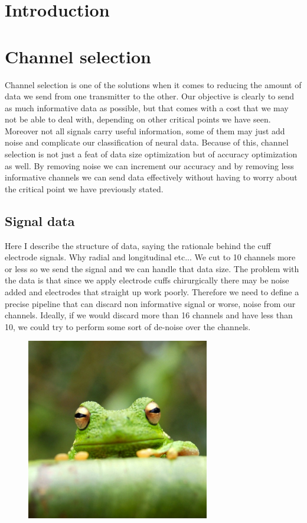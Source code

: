 \documentclass{Configuration_Files/PoliMi3i_thesis}
\begin{document}
\section{Introduction}

\section{Channel selection}

Channel selection is one of the  solutions when it comes to reducing the amount of data we send from one transmitter to the other.
Our objective is clearly to send as much informative data as possible, but that comes with a cost that we may not be able to deal with, depending on other critical points we have seen.
Moreover not all signals carry useful information, some of them may just add noise and complicate our classification of neural data.
Because of this, channel selection is not just a feat of data size optimization but of accuracy optimization as well.
By removing noise we can increment our accuracy and by removing less informative channels we can send data effectively without having to worry about the critical point we have previously stated.
\cite{abdullahEEGChannelSelection2022}


\subsection{Signal data}

Here I describe the structure of data, saying the rationale behind the cuff electrode signals.
Why radial and longitudinal etc...
We cut to 10 channels more or less so we send the signal and we can handle that data size.
The problem with the data is that since we apply electrode cuffs chirurgically there may be noise added and electrodes that straight up work poorly.
Therefore we need to define a precise pipeline that can discard non informative signal or worse, noise from our channels.
Ideally, if we would discard more than 16 channels and have less than 10, we could try to perform some sort of de-noise over the channels.

\begin{figure}[h]
      \includegraphics[width=8cm]{Images/frog.jpg}
\end{figure}
\end{document}
